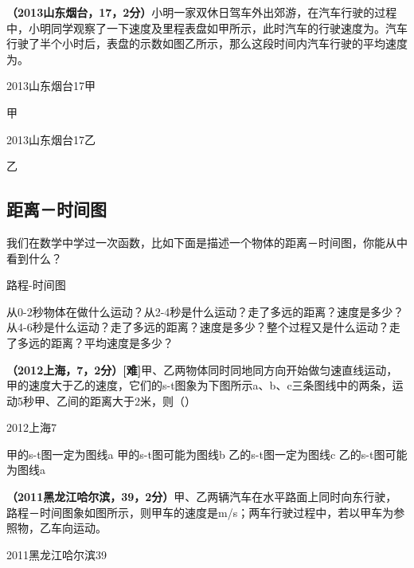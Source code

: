 \documentclass[12pt,twoside]{exam}
\begin{document}
\begin{knowledge}
\textbf{（2013山东烟台，17，2分）}小明一家双休日驾车外出郊游，在汽车行驶的过程中，小明同学观察了一下速度及里程表盘如甲所示，此时汽车的行驶速度为\answerline*[80km/h]。汽车行驶了半个小时后，表盘的示数如图乙所示，那么这段时间内汽车行驶的平均速度为\answerline*[80km/h]。

\begin{multicols}{2}
\begin{linefig}[0.8]{2013山东烟台17甲}
\caption{甲}
\end{linefig}
\columnbreak
\begin{linefig}[0.8]{2013山东烟台17乙}
\caption{乙}
\end{linefig}
\end{multicols}


\subsection{距离－时间图}
我们在数学中学过一次函数，比如下面是描述一个物体的距离－时间图，你能从中看到什么？
\begin{fig}{路程-时间图}
\end{fig}


从0-2秒物体在做什么运动？从2-4秒是什么运动？走了多远的距离？速度是多少？从4-6秒是什么运动？走了多远的距离？速度是多少？整个过程又是什么运动？走了多远的距离？平均速度是多少？

\textbf{（2012上海，7，2分）[难]}甲、乙两物体同时同地同方向开始做匀速直线运动，甲的速度大于乙的速度，它们的s-t图象为下图所示a、b、c三条图线中的两条，运动5秒甲、乙间的距离大于2米，则（\answerline*[A]）
\pagebreak
\begin{multicols}{2}
\begin{linefig}[0.9]{2012上海7}
\end{linefig}
\begin{choices}
\choice 甲的s-t图一定为图线a 
\choice 甲的s-t图可能为图线b  
\choice 乙的s-t图一定为图线c  
\choice 乙的s-t图可能为图线a
\end{choices}
\end{multicols}

\begin{multicols}{2}
\textbf{（2011黑龙江哈尔滨，39，2分）}甲、乙两辆汽车在水平路面上同时向东行驶，路程－时间图象如图所示，则甲车的速度是\answerline*[15]m/s；两车行驶过程中，若以甲车为参照物，乙车向\answerline*[西]运动。                      
\columnbreak
\begin{linefig}{2011黑龙江哈尔滨39}
\end{linefig}
\end{multicols}


\end{knowledge}
\end{document}
